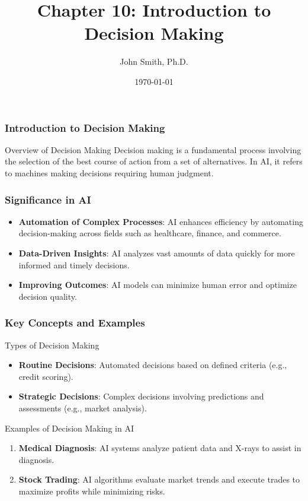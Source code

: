 \documentclass[aspectratio=169]{beamer}
\title[Introduction to Decision Making]{Chapter 10: Introduction to Decision Making}
\author[J. Smith]{John Smith, Ph.D.}
\institute[University Name]{
  Department of Computer Science\\
  University Name\\
  \vspace{0.3cm}
  Email: email@university.edu\\
  Website: www.university.edu
}
\date{\today}
\begin{document}
\frame{\titlepage}

\begin{frame}[fragile]
    \frametitle{Introduction to Decision Making}
    \begin{block}{Overview of Decision Making}
        Decision making is a fundamental process involving the selection of the best course of action from a set of alternatives. In AI, it refers to machines making decisions requiring human judgment.
    \end{block}
\end{frame}

\begin{frame}[fragile]
    \frametitle{Significance in AI}
    \begin{itemize}
        \item \textbf{Automation of Complex Processes}: AI enhances efficiency by automating decision-making across fields such as healthcare, finance, and commerce.
        \item \textbf{Data-Driven Insights}: AI analyzes vast amounts of data quickly for more informed and timely decisions.
        \item \textbf{Improving Outcomes}: AI models can minimize human error and optimize decision quality.
    \end{itemize}
\end{frame}

\begin{frame}[fragile]
    \frametitle{Key Concepts and Examples}
    \begin{block}{Types of Decision Making}
        \begin{itemize}
            \item \textbf{Routine Decisions}: Automated decisions based on defined criteria (e.g., credit scoring).
            \item \textbf{Strategic Decisions}: Complex decisions involving predictions and assessments (e.g., market analysis).
        \end{itemize}
    \end{block}

    \begin{block}{Examples of Decision Making in AI}
        \begin{enumerate}
            \item \textbf{Medical Diagnosis}: AI systems analyze patient data and X-rays to assist in diagnosis.
            \item \textbf{Stock Trading}: AI algorithms evaluate market trends and execute trades to maximize profits while minimizing risks.
        \end{enumerate}
    \end{block}
\end{frame}
\end{document}
